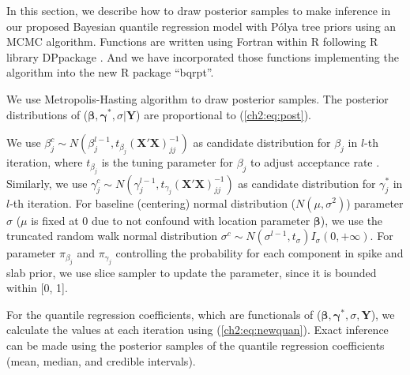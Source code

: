 \documentclass[12pt]{article}
\newcommand{\polya}{P\'{o}lya}
\begin{document}
In this section, we describe how to draw posterior samples to make
inference in our proposed Bayesian quantile regression model with
\polya{} tree priors using an MCMC algorithm. Functions are written
using Fortran within R \citep{R} following R library
DPpackage \citep{DPpackage}. And we have incorporated those
functions implementing the algorithm into the new R \citep{R} package
``bqrpt''.

We use Metropolis-Hasting algorithm to draw posterior samples.
The posterior distributions of ($\bm \beta, \bm \gamma^{*}, \sigma| \bm Y$) are proportional to (\ref{ch2:eq:post}).

We use $\beta_j^c \sim N(\beta_j^{l-1}, t_{\beta_j} (\bm{X\prime X})^{-1}_{jj})$ as candidate distribution for $\beta_j$ in $l$-th iteration,
where $t_{\beta_j}$ is the tuning parameter for $\beta_j$ to adjust acceptance rate \citep{jara2009}.
Similarly, we use $\gamma_j^c \sim N(\gamma_j^{l-1}, t_{\gamma_j}(\bm{X\prime X})^{-1}_{jj})$ as candidate distribution for $\gamma_j^{*}$ in $l$-th iteration.
For baseline (centering) normal distribution ($N(\mu, \sigma^2)$) parameter $\sigma$ ($\mu$ is fixed at 0 due to not confound with location parameter $\bm \beta$),
we use the truncated random walk normal distribution $\sigma^c \sim N(\sigma^{l-1}, t_{\sigma}) I_{\sigma}(0, +\infty)$.
For parameter $\pi_{\beta_j}$ and $\pi_{\gamma_j}$ controlling the probability for each component in spike and slab prior,
we use slice sampler to update the parameter, since it is bounded within [0, 1].



For the quantile regression coefficients, which are functionals of ($\bm \beta, \bm \gamma^{*}, \sigma, \bm Y$),
we calculate the values at each iteration using (\ref{ch2:eq:newquan}).
Exact inference can be made using the posterior samples of the quantile regression coefficients (mean, median, and credible intervals).
\end{document}

